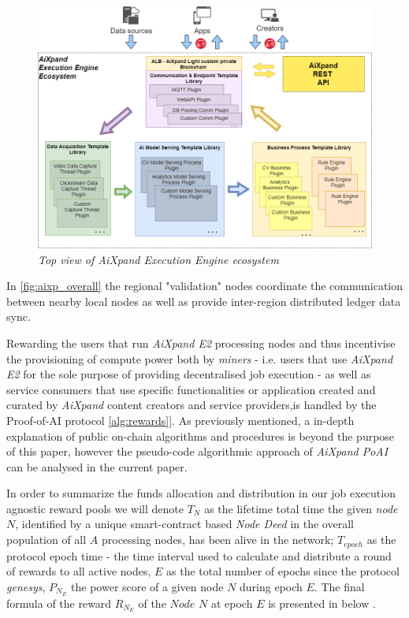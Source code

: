 \documentclass{article}
\begin{document}
\begin{figure}[h]
    \centering
    \includegraphics[width=16cm]{ee.png}
    \caption{\textit{Top view of AiXpand Execution Engine ecosystem}}
    \label{fig:ee}
\end{figure}




In \figurename{\ref{fig:aixp_overall}} the regional "validation" nodes coordinate the communication between nearby local nodes as well as provide inter-region distributed ledger data sync.

Rewarding the users that run \textit{AiXpand E2} processing nodes and thus incentivise the provisioning of compute power both by \textit{miners} - i.e. users that use \textit{AiXpand E2} for the sole purpose of providing decentralised job execution - as well as service consumers that use specific functionalities or application created and curated by \textit{AiXpand} content creators and service providers,is handled by the Proof-of-AI protocol \ref{alg:rewards}]. As previously mentioned, a in-depth explanation of public on-chain algorithms and procedures is beyond the purpose of this paper, however the pseudo-code algorithmic approach of \textit{AiXpand PoAI} can be analysed in the current paper.

In order to summarize the funds allocation and distribution in our job execution agnostic reward pools we will denote $T_{N}$ as the lifetime total time the given \textit{node} $N$, identified by a unique smart-contract based \textit{Node Deed} in the overall population of all $A$ processing nodes, has been alive in the network; $T_{epoch}$ as the protocol epoch time - the time interval used to calculate and distribute a round of rewards to all active nodes, $E$ as the total number of epochs since the protocol \textit{genesys}, $P_{N_E}$ the power score of a given node $N$ during epoch $E$. The final formula of the reward $R_{N_E}$ of the $Node$ $N$ at epoch $E$ is presented in below \equationautorefname{\ref{eqr:5}}. 
\end{document}
